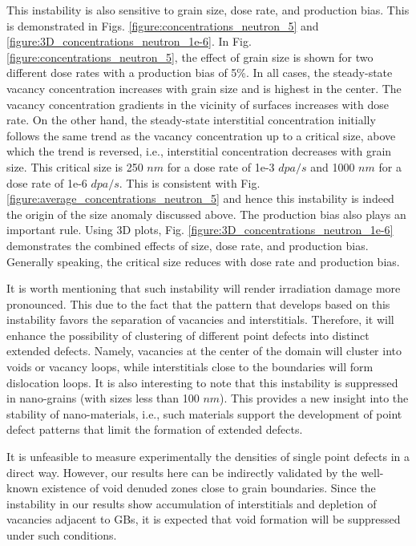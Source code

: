 \documentclass[utf8]{frontiersSCNS} %
\begin{document}
    This instability is also sensitive to grain size, dose rate, and production bias. This is demonstrated in Figs. \ref{figure:concentrations_neutron_5} and \ref{figure:3D_concentrations_neutron_1e-6}. In Fig. \ref{figure:concentrations_neutron_5}, the effect of grain size is shown for two different dose rates with a production bias of 5\%. In all cases, the steady-state vacancy concentration increases with grain size and is highest in the center. The vacancy concentration gradients in the vicinity of surfaces increases with dose rate. On the other hand, the steady-state interstitial concentration initially follows the same trend as the vacancy concentration up to a critical size, above which the trend is reversed, i.e., interstitial concentration decreases with grain size. This critical size is 250 $nm$ for a dose rate of 1e-3 $dpa/s$ and 1000 $nm$ for a dose rate of 1e-6 $dpa/s$. This is consistent with Fig. \ref{figure:average_concentrations_neutron_5} and hence this instability is indeed the origin of the size anomaly discussed above. The production bias also plays an important rule. Using 3D plots, Fig. \ref{figure:3D_concentrations_neutron_1e-6} demonstrates the combined effects of size, dose rate, and production bias. Generally speaking, the critical size reduces with dose rate and production bias.
    
    It is worth mentioning that such instability will render irradiation damage more pronounced. This due to the fact that the pattern that develops based on this instability favors the separation of vacancies and interstitials. Therefore, it will enhance the possibility of clustering of different point defects into distinct extended defects. Namely, vacancies at the center of the domain will cluster into voids or vacancy loops, while interstitials close to the boundaries will form dislocation loops. It is also interesting to note that this instability is suppressed in nano-grains (with sizes less than 100 $nm$). This provides a new insight into the stability of nano-materials, i.e., such materials support the development of point defect patterns that limit the formation of extended defects.

    It is unfeasible to measure experimentally the densities of single point defects in a direct way. However, our results here can be indirectly validated by the well-known existence of void denuded zones close to grain boundaries. Since the instability in our results show accumulation of interstitials and depletion of vacancies adjacent to GBs, it is expected that void formation will be suppressed under such conditions.
    
\end{document}
